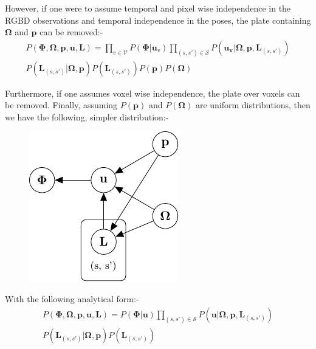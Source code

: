However, if one were to assume temporal and pixel wise independence in the RGBD observations and temporal independence in 
the poses, the plate containing $\mathbf{\Omega}$ and $\mathbf{p}$ can be removed:-
\begin{equation}
\begin{split}
P(\mathbf{\Phi}, \mathbf{\Omega}, \mathbf{p}, \mathbf{u}, \mathbf{L}) = 
\prod_{v \in \mathcal{V}}P(\mathbf{\Phi}|\mathbf{u}_{v})
\prod_{(s, s') \in \mathcal{S}}P(\mathbf{u_{v}}|\mathbf{\Omega}, \mathbf{p}, \mathbf{L}_{(s, s')})\\
P(\mathbf{L}_{(s, s')}|\mathbf{\Omega}, \mathbf{p}) P(\mathbf{L}_{(s, s')})P(\mathbf{p})P(\mathbf{\Omega})
\end{split}
\end{equation}

Furthermore, if one assumes voxel wise independence, the plate over voxels can be removed. Finally, assuming $P(\mathbf{p})$ and 
$P(\mathbf{\Omega})$ are uniform distributions, then we have the following, simpler distribution:-
\begin{figure}[h]
	\centering
	\includegraphics{graphical_models/pgm2.pdf}
\end{figure}

With the following analytical form:-
\begin{equation}
\begin{split}
P(\mathbf{\Phi}, \mathbf{\Omega}, \mathbf{p}, \mathbf{u}, \mathbf{L}) = 
P(\mathbf{\Phi}|\mathbf{u})
\prod_{(s, s') \in \mathcal{S}}P(\mathbf{u}|\mathbf{\Omega}, \mathbf{p}, \mathbf{L}_{(s, s')})\\
P(\mathbf{L}_{(s, s')}|\mathbf{\Omega}, \mathbf{p})
P(\mathbf{L}_{(s, s')})
\end{split}
\end{equation}

